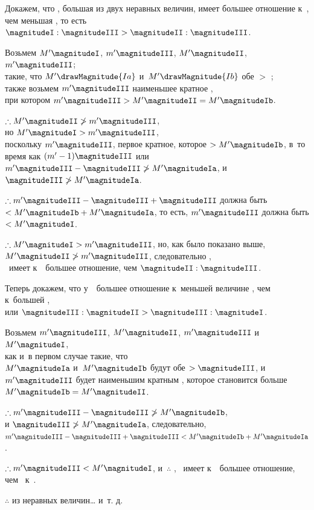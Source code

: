 \documentclass[letters,booklanguage=russian]{byrnebook}
\begin{document}
Докажем, что \magnitudeI, большая из двух неравных величин, имеет большее отношение к~\magnitudeIII, чем меньшая \magnitudeII, то есть $\magnitudeI : \magnitudeIII > \magnitudeII : \magnitudeIII$.

\begin{center}
Возьмем $M' \magnitudeI$, $m' \magnitudeIII$, $M' \magnitudeII$, $m' \magnitudeIII$;\\
такие, что $M' \drawMagnitude{Ia}$ и~$M' \drawMagnitude{Ib}$ обе $>$ \magnitudeIII;\\
также возьмем $m' \magnitudeIII$ наименьшее кратное \magnitudeIII,\\
при котором $m' \magnitudeIII > M' \magnitudeII = M' \magnitudeIb$.

$\therefore M' \magnitudeII \ngtr m' \magnitudeIII$,\\
но $M' \magnitudeI > m' \magnitudeIII$,\\
поскольку $m' \magnitudeIII$, первое кратное, которое $> M' \magnitudeIb$, в~то время как $(m' - 1)\magnitudeIII$ или $m' \magnitudeIII - \magnitudeIII \ngtr M' \magnitudeIa$, и $\magnitudeIII \ngtr M' \magnitudeIa$.

$\therefore m' \magnitudeIII - \magnitudeIII + \magnitudeIII$ должна быть $< M' \magnitudeIb + M' \magnitudeIa$,
то есть, $m' \magnitudeIII$ должна быть $< M' \magnitudeI$.

$\therefore M' \magnitudeI > m' \magnitudeIII$, но, как было показано выше,\\
$M' \magnitudeII \ngtr m' \magnitudeIII$, следовательно ,\\ \magnitudeI\ имеет к~\magnitudeIII\ большее отношение, чем $\magnitudeII : \magnitudeIII$.

Теперь докажем, что у~\magnitudeIII\ большее отношение к~меньшей величине \magnitudeII, чем к~большей \magnitudeI,\\
или $\magnitudeIII : \magnitudeII > \magnitudeIII : \magnitudeI$.

Возьмем $m' \magnitudeIII$, $M' \magnitudeII$, $m' \magnitudeIII$ и~$M' \magnitudeI$,\\
как и~в первом случае такие, что\\
$M' \magnitudeIa$ и~$M' \magnitudeIb$ будут обе $> \magnitudeIII$, и~$m' \magnitudeIII$ будет наименьшим кратным \magnitudeIII, которое становится больше $M' \magnitudeIb = M' \magnitudeII$.

$\therefore m' \magnitudeIII - \magnitudeIII \ngtr M' \magnitudeIb$,\\
и $\magnitudeIII \ngtr M' \magnitudeIa$, следовательно,\\
$m' \magnitudeIII - \magnitudeIII + \magnitudeIII  < M' \magnitudeIb + M' \magnitudeIa$.

$\therefore m' \magnitudeIII < M' \magnitudeI$, и~$\therefore$ , \magnitudeIII\ имеет к~\magnitudeII\ большее отношение, чем \magnitudeIII\ к~\magnitudeI.

$\therefore$ из неравных величин… и~т. д.
\end{center}
\end{document}
